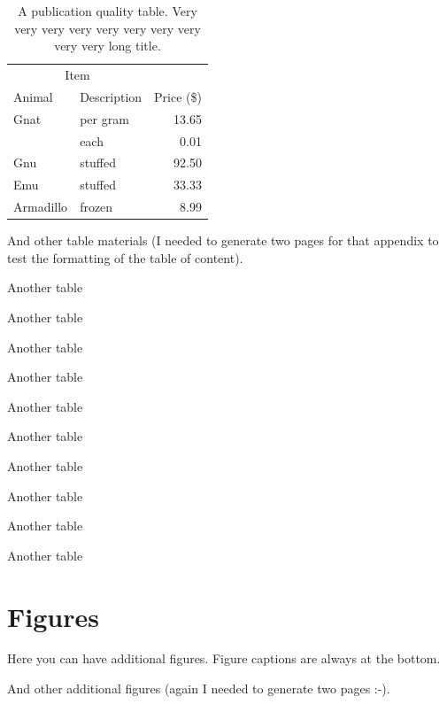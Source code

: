 \documentclass[msc,oneside]{ubcthesis}%
\begin{document}
\begin{table}[tbph]
\centering
\caption{A publication quality table. Very very very very very very very very very very long title.
\label{table:food}}
\begin{tabular}{@{}llr@{}} \toprule 
\multicolumn{2}{c}{Item} \\ \cmidrule(r){1-2} 
Animal & Description & Price (\$)\\ \midrule 
Gnat & per gram & 13.65 \\ 
& each & 0.01 \\ 
Gnu & stuffed & 92.50 \\ 
Emu & stuffed & 33.33 \\ 
Armadillo & frozen & 8.99 \\ \bottomrule 
\end{tabular}
\end{table}

\newpage
And other table materials (I needed to generate two pages for that appendix to test the formatting of the table of content).

\begin{table}
\caption{Another table}
\end{table}

\begin{table}
\caption{Another table}
\end{table}
\begin{table}
\caption{Another table}
\end{table}
\begin{table}
\caption{Another table}
\end{table}
\begin{table}
\caption{Another table}
\end{table}

\begin{table}
\caption{Another table}
\end{table}
\begin{table}
\caption{Another table}
\end{table}
\begin{table}
\caption{Another table}
\end{table}
\begin{table}
\caption{Another table}
\end{table}
\begin{table}
\caption{Another table}
\end{table}

\chapter{Figures}
Here you can have additional figures. Figure captions are always at the bottom.

\newpage

And other additional figures (again I needed to generate two pages :-).
\end{document}
